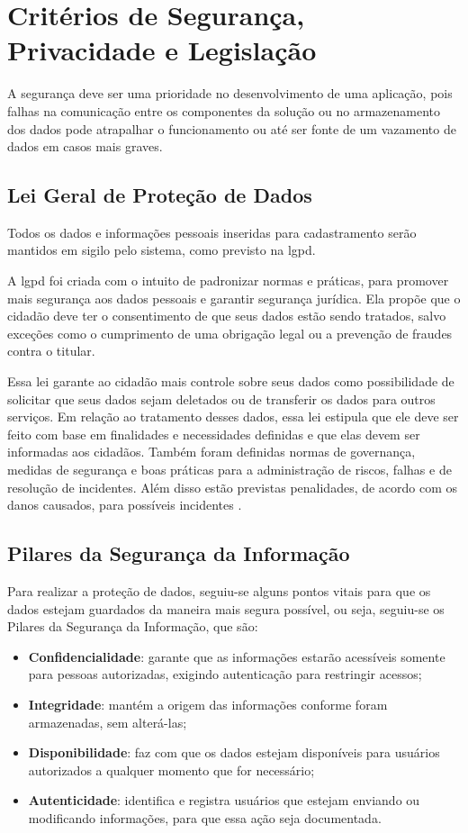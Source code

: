 \section {Critérios de Segurança, Privacidade e Legislação}
A segurança deve ser uma prioridade no desenvolvimento de uma aplicação, pois falhas na comunicação entre os componentes da solução ou no armazenamento dos dados pode atrapalhar o funcionamento ou até ser fonte de um vazamento de dados em casos mais graves. 

\subsection{Lei Geral de Proteção de Dados}
Todos os dados e informações pessoais inseridas para cadastramento serão mantidos em sigilo pelo sistema, como previsto na \ac{lgpd}.

A \ac{lgpd} foi criada com o intuito de padronizar normas e práticas, para promover mais segurança aos dados pessoais e garantir segurança jurídica. Ela propõe que o cidadão deve ter o consentimento de que seus dados estão sendo tratados, salvo exceções como o cumprimento de uma obrigação legal ou a prevenção de fraudes contra o titular.

Essa lei garante ao cidadão mais controle sobre seus dados como possibilidade de solicitar que seus dados sejam deletados ou de transferir os dados para outros serviços. Em relação ao tratamento desses dados, essa lei estipula que ele deve ser feito com base em finalidades e necessidades definidas e que elas devem ser informadas aos cidadãos. Também foram definidas normas de governança, medidas de segurança e boas práticas para a administração de riscos, falhas e de resolução de incidentes. Além disso estão previstas penalidades, de acordo com os danos causados, para possíveis incidentes \cite{lgpd-serpro:2018}.

\subsection {Pilares da Segurança da Informação}
Para realizar a proteção de dados, seguiu-se alguns pontos vitais para que os dados estejam guardados da maneira mais segura possível, ou seja, seguiu-se os Pilares da Segurança da Informação, que são:

\begin{itemize}
\item \textbf{Confidencialidade}: garante que as informações estarão acessíveis somente para pessoas autorizadas, exigindo autenticação para restringir acessos;
\item \textbf{Integridade}: mantém a origem das informações conforme foram armazenadas, sem alterá-las;
\item \textbf{Disponibilidade}: faz com que os dados estejam disponíveis para usuários autorizados a qualquer momento que for necessário;
\item \textbf{Autenticidade}: identifica e registra usuários que estejam enviando ou modificando informações, para que essa ação seja documentada.
\end{itemize}

